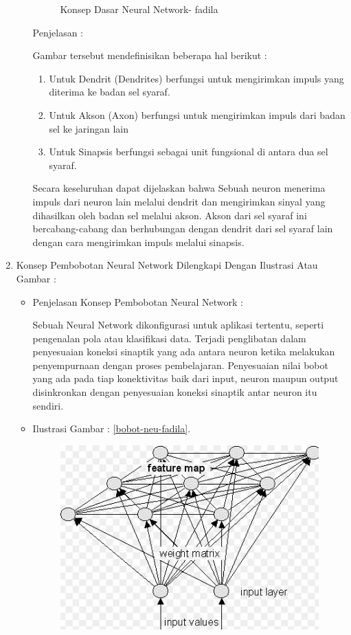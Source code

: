 \begin{enumerate}
\begin{itemize}
\begin{figure}[!hbtp]
\caption{Konsep Dasar Neural Network- fadila}
\label{konsep-neu-fadila}
\end{figure}
\par
\par Penjelasan :
\par Gambar tersebut mendefinisikan beberapa hal berikut :
\begin{enumerate}
\item Untuk Dendrit (Dendrites) berfungsi untuk mengirimkan impuls yang diterima ke badan sel syaraf.
\item Untuk Akson (Axon) berfungsi untuk mengirimkan impuls dari badan sel ke jaringan lain
\item Untuk Sinapsis berfungsi sebagai unit fungsional di antara dua sel syaraf.
\end{enumerate}
\par Secara keseluruhan dapat dijelaskan bahwa Sebuah neuron menerima impuls dari neuron lain melalui dendrit dan mengirimkan sinyal yang dihasilkan oleh badan sel melalui akson. Akson dari sel syaraf ini bercabang-cabang dan berhubungan dengan dendrit dari sel syaraf lain dengan cara mengirimkan impuls melalui sinapsis.
\par
\end{itemize}
\par
\par
\item Konsep Pembobotan Neural Network Dilengkapi Dengan Ilustrasi Atau Gambar :
\begin{itemize}
\item Penjelasan Konsep Pembobotan Neural Network :
\par  Sebuah Neural Network dikonfigurasi untuk aplikasi tertentu, seperti pengenalan pola atau klasifikasi data. Terjadi penglibatan dalam penyesuaian koneksi sinaptik yang ada antara neuron ketika melakukan penyempurnaan dengan proses pembelajaran. Penyesuaian nilai bobot yang ada pada tiap konektivitas baik dari input, neuron maupun output disinkronkan dengan penyesuaian koneksi sinaptik antar neuron itu sendiri.
\par
\item Ilustrasi Gambar : \ref{bobot-neu-fadila}.
\par
\begin{figure}[!hbtp]
\centering
\includegraphics[scale=0.2]{figures/bobot-neu-fadila.jpg}

\end{figure}
\end{itemize}
\end{enumerate}
